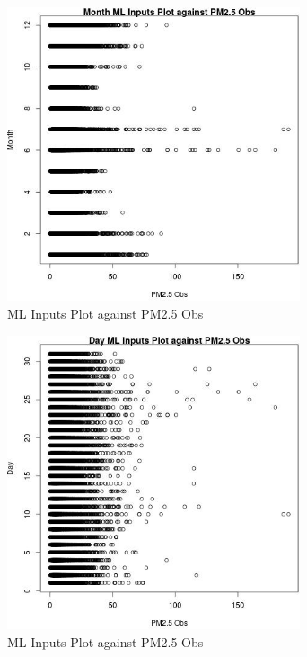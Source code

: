 \begin{figure} 
\centering  
\includegraphics[width=0.77\textwidth]{Code_Outputs/Report_ML_input_PM25_Step4_part_e_de_duplicated_aves_MonthvPM25_Obs.jpg} 
\caption{\label{fig:Report_ML_input_PM25_Step4_part_e_de_duplicated_avesMonthvPM25_Obs}ML Inputs Plot against PM2.5 Obs} 
\end{figure} 
 

\clearpage 

\begin{figure} 
\centering  
\includegraphics[width=0.77\textwidth]{Code_Outputs/Report_ML_input_PM25_Step4_part_e_de_duplicated_aves_DayvPM25_Obs.jpg} 
\caption{\label{fig:Report_ML_input_PM25_Step4_part_e_de_duplicated_avesDayvPM25_Obs}ML Inputs Plot against PM2.5 Obs} 
\end{figure} 
 

